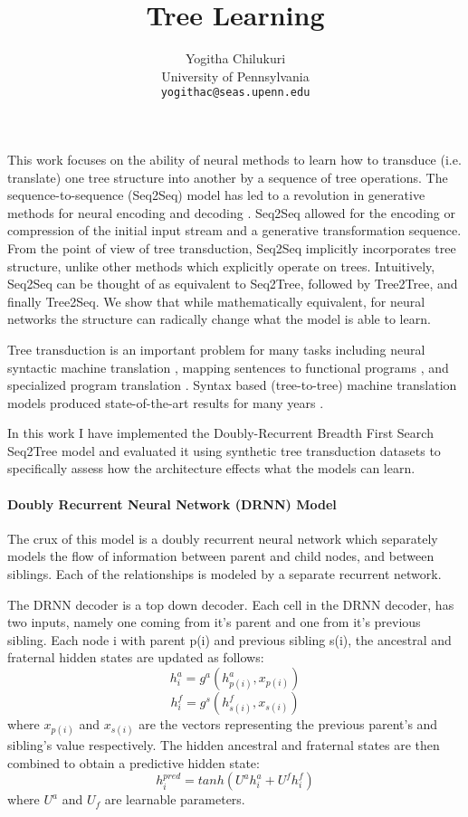\documentclass[11pt,a4paper]{article}
\title{Tree Learning}
\author{\quad Yogitha Chilukuri\\
  University of Pennsylvania\\
  {\tt yogithac@seas.upenn.edu}
}
\date{}
\begin{document}
\maketitle

This work focuses on the ability of neural methods to learn how to transduce (i.e. translate) one tree structure into another by a sequence of tree operations.
The sequence-to-sequence (Seq2Seq) model has led to a revolution in generative methods for neural encoding and decoding \citep{sutskever2014sequence}. Seq2Seq allowed for the encoding or compression of the initial input stream and a generative transformation sequence. From the point of view of tree transduction, Seq2Seq implicitly incorporates tree structure, unlike other methods which explicitly operate on trees.  
Intuitively, Seq2Seq can be thought of as equivalent to Seq2Tree, followed by Tree2Tree, and finally Tree2Seq. We show that while mathematically equivalent, for neural networks the structure can radically change what the model is able to learn.

Tree transduction is an important problem for many tasks including neural syntactic machine translation \citep{cowan2008tree,razmara2011application,wang2007chinese}, mapping sentences to functional programs \citep{alvarez2017tree}, and specialized program translation \citep{alur2012streaming}.
Syntax based (tree-to-tree) machine translation models produced state-of-the-art results for many years \citep{cowan2008tree,razmara2011application}. 

In this work I have implemented the Doubly-Recurrent Breadth First Search  \citep{alvarez2017tree} Seq2Tree model and evaluated it using synthetic tree transduction datasets to specifically assess how the architecture effects what the models can learn. 

\paragraph{Doubly Recurrent Neural Network (DRNN) Model}

The crux of this model is a doubly recurrent neural network which separately models the flow of information between parent and child nodes, and between siblings. Each of the relationships is modeled by a separate recurrent network.

The DRNN decoder is a top down decoder. Each cell in the DRNN decoder, has two inputs, namely one coming from it's parent and one from it's previous sibling. Each node i with parent p(i) and previous sibling s(i), the ancestral and fraternal hidden states are updated as follows:
\[h_{i}^{a} = g^{a}(h_{p(i)}^{a}, x_{p(i)})\] 
\[h_{i}^{f} = g^{s}(h_{s(i)}^{f}, x_{s(i)})\]
where $x_{p(i)}$ and $x_{s(i)}$ are the vectors representing the previous parent's and sibling's value respectively. The hidden ancestral and fraternal states are then combined to obtain a predictive hidden state:
\[h_{i}^{pred} = tanh(U^ah_{i}^{a} + U^fh_{i}^{f})\] 
where $U^a$ and $U_f$ are learnable parameters. 
\end{document}
